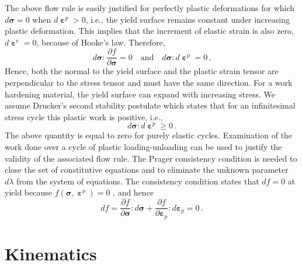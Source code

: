 The above flow rule is easily justified for perfectly plastic deformations for which $d\boldsymbol{\sigma} = 0$  when $d{{\bm{\upepsilon }}^p} > 0$, i.e., the yield surface remains constant under increasing plastic deformation. This implies that the increment of elastic strain is also zero, $d{{\bm{\upepsilon }}^e} = 0$, because of Hooke's law.
Therefore,
\begin{equation}
d\boldsymbol{\sigma}:\frac{\partial f}{\partial \boldsymbol{\sigma}} = 0 \quad \text{and} \quad d\boldsymbol{\sigma}:d{{\bm{\upepsilon }}^p} = 0 \,.
\end{equation}
Hence, both the normal to the yield surface and the plastic strain tensor are perpendicular to the stress tensor and must have the same direction.
For a work hardening material, the yield surface can expand with increasing stress.
We assume Drucker's second stability postulate which states that for an infinitesimal stress cycle this plastic work is positive, i.e.,
\begin{equation}
d\boldsymbol{\sigma}: d{{\bm{\upepsilon }}^p} \ge 0 \,.
\end{equation}
The above quantity is equal to zero for purely elastic cycles.
Examination of the work done over a cycle of plastic loading-unloading can be used to justify the validity of the associated flow rule.
The Prager consistency condition is needed to close the set of constitutive equations and to eliminate the unknown parameter $d\lambda$ from the system of equations.
The consistency condition states that $df = 0$  at yield because  $f(\boldsymbol{\sigma},{{\bm{\upepsilon }}^p}) = 0$ , and hence
\begin{equation}
df = \frac{\partial f}{\partial \boldsymbol{\sigma}}:d\boldsymbol{\sigma} + \frac{\partial f}{\partial \boldsymbol{\varepsilon}_p}:d\boldsymbol{\varepsilon}_p = 0 \,.
\end{equation}

\section{Kinematics} 